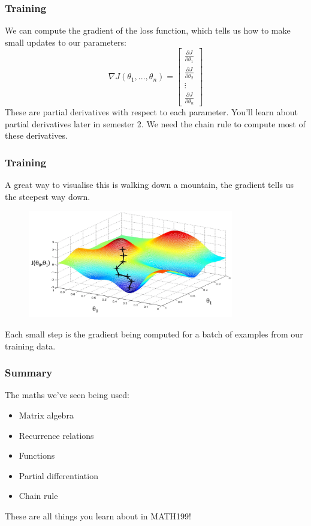 \documentclass{beamer}
\begin{document}
\begin{frame}
    \frametitle{Training}
    We can compute the \alert{gradient} of the loss function, which tells us how to make small updates to our parameters:
    \[\nabla J(\theta_1,... , \theta_n) = \begin{bmatrix}
            \frac{\partial J}{\partial \theta_1} \\[6pt]
            \frac{\partial J}{\partial \theta_2} \\[6pt]
            \vdots                               \\[6pt]
            \frac{\partial J}{\partial \theta_n}
        \end{bmatrix}\]
    These are partial derivatives with respect to each parameter. You'll learn about partial derivatives later in semester 2. We need the chain rule to compute most of these derivatives.
\end{frame}

\begin{frame}
    \frametitle{Training}
    A great way to visualise this is walking down a mountain, the gradient tells us the steepest way down.
    \begin{figure}
        \centering
        \includegraphics[width=0.8\textwidth]{images/gradient-descent.png}
    \end{figure}
    Each small step is the gradient being computed for a batch of examples from our training data.
\end{frame}

\begin{frame}
    \frametitle{Summary}
    The maths we've seen being used:
    \begin{itemize}
        \item Matrix algebra
        \item Recurrence relations
        \item Functions
        \item Partial differentiation
        \item Chain rule
    \end{itemize}
    \vspace{0.5cm}
    These are all things you learn about in MATH199!
\end{frame}
\end{document}
